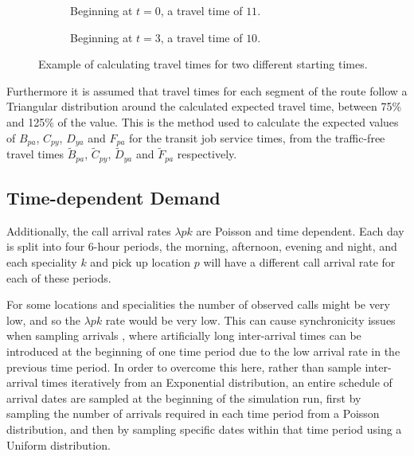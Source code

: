 \documentclass[preprint,12pt]{elsarticle}
\begin{document}
\begin{figure}
    \begin{center}
    \begin{subfigure}{6.6cm}
    
    \caption{Beginning at $t=0$, a travel time of $11$.}
    \label{fig:travel_times_1}
    \end{subfigure}
    \begin{subfigure}{6.6cm}
    
    \caption{Beginning at $t=3$, a travel time of $10$.}
    \label{fig:travel_times_2}
    \end{subfigure}
    \end{center}
    \caption{Example of calculating travel times for two different starting
    times.}
    \label{fig:travel_times}
\end{figure}

Furthermore it is assumed that travel times for each segment of the route follow a Triangular distribution around the calculated expected travel time, between 75\% and 125\% of the value.
This is the method used to calculate the expected values of $B_{pa}$, $C_{py}$,
$D_{ya}$ and $F_{pa}$ for the transit job service times, from the traffic-free
travel times $\tilde{B}_{pa}$, $\tilde{C}_{py}$, $\tilde{D}_{ya}$ and
$\tilde{F}_{pa}$ respectively.

\subsection{Time-dependent Demand}
Additionally, the call arrival rates $\lambda{pk}$ are Poisson and time dependent. Each day is split into four 6-hour periods, the morning, afternoon, evening and night, and each speciality $k$ and pick up location $p$ will have a different call arrival rate for each of these periods.

For some locations and specialities the number of observed calls might be very low, and so the $\lambda{pk}$ rate would be very low. This can cause synchronicity issues when sampling arrivals \citep{pidd2004computer}, where artificially long inter-arrival times can be introduced at the beginning of one time period due to the low arrival rate in the previous time period.
In order to overcome this here, rather than sample inter-arrival times iteratively from an Exponential distribution, an entire schedule of arrival dates are sampled at the beginning of the simulation run, first by sampling the number of arrivals required in each time period from a Poisson distribution, and then by sampling specific dates within that time period using a Uniform distribution.
\end{document}
